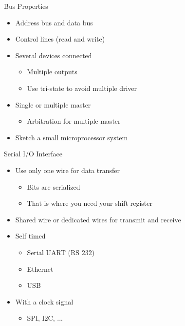 \begin{frame}[fragile]{Bus Properties}
\begin{itemize}
\item Address bus and data bus
\item Control lines (read and write)
\item Several devices connected
\begin{itemize}
\item Multiple outputs
\item Use tri-state to avoid multiple driver
\end{itemize}
\item Single or multiple master
\begin{itemize}
\item Arbitration for multiple master
\end{itemize}
\item Sketch a small microprocessor system
\end{itemize}
\end{frame}

\begin{frame}[fragile]{Serial I/O Interface}
\begin{itemize}
\item Use only one wire for data transfer
\begin{itemize}
\item Bits are serialized
\item That is where you need your shift register
\end{itemize}
\item Shared wire or dedicated wires for transmit and receive
\item Self timed
\begin{itemize}
\item Serial UART (RS 232)
\item Ethernet
\item USB
\end{itemize}
\item With a clock signal
\begin{itemize}
\item SPI, I2C, ...
\end{itemize}
\end{itemize}
\end{frame}



